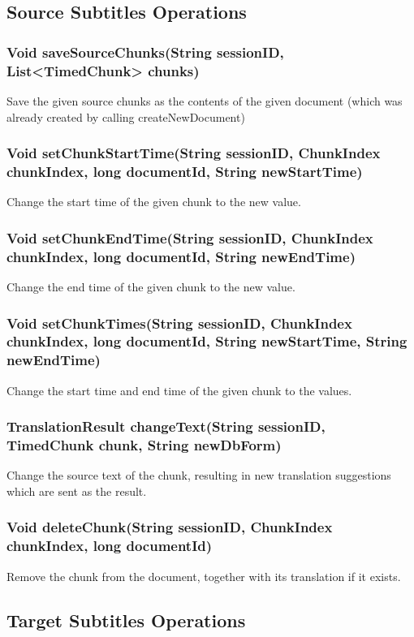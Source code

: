 \subsection{Source Subtitles Operations}

\subsubsection{Void saveSourceChunks(String sessionID, List<TimedChunk> chunks)}
Save the given source chunks as the contents of the given document
(which was already created by calling createNewDocument)	 

\subsubsection{Void setChunkStartTime(String sessionID, ChunkIndex chunkIndex, long documentId, String newStartTime)}
Change the start time of the given chunk to the new value.

\subsubsection{Void setChunkEndTime(String sessionID, ChunkIndex chunkIndex, long documentId, String newEndTime)}
Change the end time of the given chunk to the new value.

\subsubsection{Void setChunkTimes(String sessionID, ChunkIndex chunkIndex, long documentId, String newStartTime, String newEndTime)}
Change the start time and end time of the given chunk to the values.

\subsubsection{TranslationResult changeText(String sessionID, TimedChunk chunk, String newDbForm)}
Change the source text of the chunk,
resulting in new translation suggestions
which are sent as the result.

\subsubsection{Void deleteChunk(String sessionID, ChunkIndex chunkIndex, long documentId)}
Remove the chunk from the document, together with its translation if it exists.

\subsection{Target Subtitles Operations}

